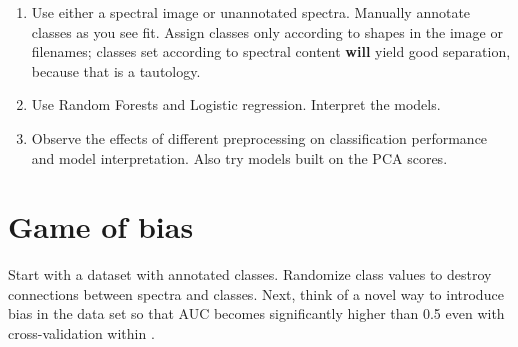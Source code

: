 \begin{enumerate}

\item Use either a spectral image or unannotated spectra. Manually annotate classes as you see fit. Assign classes only according to shapes in the image or filenames; classes set according to spectral content {\bf will} yield good separation, because that is a tautology.

\item Use Random Forests and Logistic regression. Interpret the models.

\item Observe the effects of different preprocessing on classification performance and model interpretation. Also try models built on the PCA scores.

\end{enumerate}


\section{Game of bias}

Start with a dataset with annotated classes. Randomize class values to destroy connections between spectra and classes. Next, think of a novel way to introduce bias in the data set so that AUC becomes significantly higher than 0.5 even with cross-validation within .

